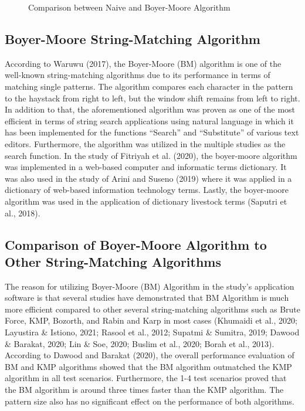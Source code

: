 \hfill

\begin{figure}[hbt!]
   \center
    \noindent{}
   \caption{Comparison between Naive and Boyer-Moore Algorithm}
   \label{fig:Boyer-Mooore}
\end{figure}

\subsection*{Boyer-Moore String-Matching Algorithm}
\hspace\parindent
According to Waruwu (2017), the Boyer-Moore (BM) algorithm is one of the well-known string-matching
algorithms due to its performance in terms of matching single patterns. The algorithm compares each
character in the pattern to the haystack from right to left, but the window shift remains from left
to right. In addition to that, the aforementioned algorithm was proven as one of the most efficient
in terms of string search applications using natural language in which it has been implemented for
the functions “Search” and “Substitute” of various text editors. Furthermore, the algorithm was
utilized in the multiple studies as the search function. In the study of Fitriyah et al. (2020), the
boyer-moore algorithm was implemented in a web-based computer and informatic terms dictionary. It
was also used in the study of Arini and Suseno (2019) where it was applied in a dictionary of
web-based information technology terms. Lastly, the boyer-moore algorithm was used in the
application of dictionary livestock terms (Saputri et al., 2018).

\subsection*{Comparison of Boyer-Moore Algorithm to Other String-Matching Algorithms}

\hspace\parindent
The reason for utilizing Boyer-Moore (BM) Algorithm in the study’s application software is that
several studies have demonstrated that BM Algorithm is much more efficient compared to other several
string-matching algorithms such as Brute Force, KMP, Bozorth, and Rabin and Karp in most cases
(Khumaidi et al., 2020; Layustira \& Istiono, 2021; Rasool et al., 2012; Supatmi \& Sumitra, 2019;
Dawood \& Barakat, 2020; Lin \& Soe, 2020; Buslim et al., 2020; Borah et al., 2013). According to
Dawood and Barakat (2020), the overall performance evaluation of BM and KMP algorithms showed that
the BM algorithm outmatched the KMP algorithm in all test scenarios. Furthermore, the 1-4 test
scenarios proved that the BM algorithm is around three times faster than the KMP algorithm. The
pattern size also has no significant effect on the performance of both algorithms.

